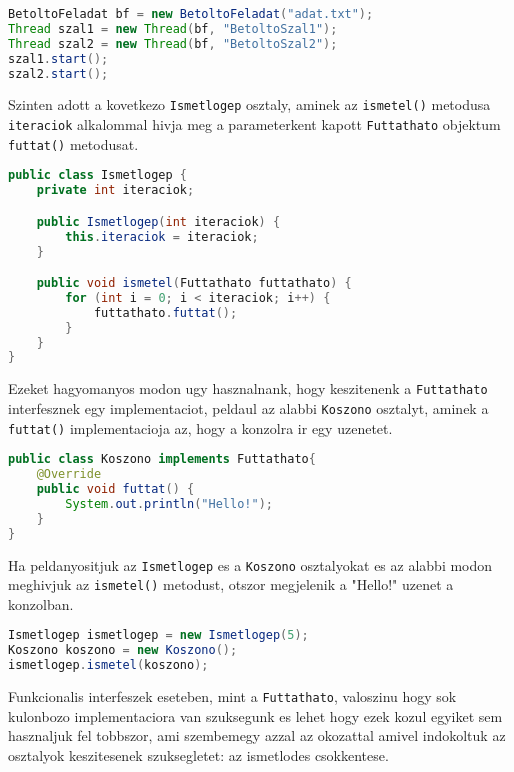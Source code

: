 \documentclass{article}
\let\l\lstinline
\begin{document}
\begin{lstlisting}[language=Java, caption=Uj szalak inditasa ugyanazzal a Runnable objektummal]
BetoltoFeladat bf = new BetoltoFeladat("adat.txt");
Thread szal1 = new Thread(bf, "BetoltoSzal1");
Thread szal2 = new Thread(bf, "BetoltoSzal2");
szal1.start();
szal2.start();
\end{lstlisting}


Szinten adott a kovetkezo \l{Ismetlogep} osztaly, aminek az \l{ismetel()} metodusa \l{iteraciok} alkalommal hivja meg a parameterkent kapott \l{Futtathato} objektum \l{futtat()} metodusat.

\begin{lstlisting}[language=Java, caption=Ismetlogep osztaly]
public class Ismetlogep {
	private int iteraciok;

	public Ismetlogep(int iteraciok) {
		this.iteraciok = iteraciok;
	}

	public void ismetel(Futtathato futtathato) {
		for (int i = 0; i < iteraciok; i++) {
			futtathato.futtat();
		}
	}
}
\end{lstlisting}

Ezeket hagyomanyos modon ugy hasznalnank, hogy keszitenenk a \l{Futtathato} interfesznek egy implementaciot, peldaul az alabbi \l{Koszono} osztalyt, aminek a \l{futtat()} implementacioja az, hogy a konzolra ir egy uzenetet.

\begin{lstlisting}[language=Java, caption=Koszono osztaly]
public class Koszono implements Futtathato{
    @Override
    public void futtat() {
        System.out.println("Hello!");
    }
}
\end{lstlisting}

Ha peldanyositjuk az \l{Ismetlogep} es a \l{Koszono} osztalyokat es az alabbi modon meghivjuk az \l{ismetel()} metodust, otszor megjelenik a "Hello!" uzenet a konzolban.

\begin{lstlisting}[language=Java, caption=Koszono osztaly es Ismetlogep hasznalata]
Ismetlogep ismetlogep = new Ismetlogep(5);
Koszono koszono = new Koszono();
ismetlogep.ismetel(koszono);
\end{lstlisting}

Funkcionalis interfeszek eseteben, mint a \l{Futtathato}, valoszinu hogy sok kulonbozo implementaciora van szuksegunk es lehet hogy ezek kozul egyiket sem hasznaljuk fel tobbszor, ami szembemegy azzal az okozattal amivel indokoltuk az osztalyok keszitesenek szuksegletet: az ismetlodes csokkentese.
\end{document}
